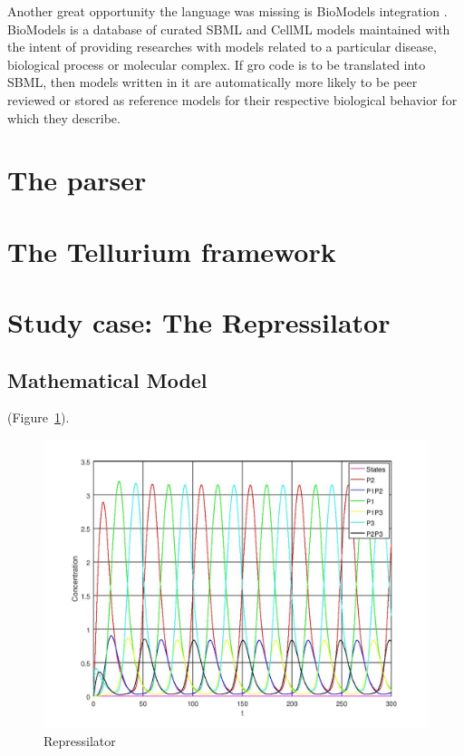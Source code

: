 \documentclass[12pt]{article}
\begin{document}
    Another great opportunity the language was missing is BioModels integration \cite{LeNovere2006}. BioModels is a database of curated SBML and CellML models maintained with the intent of providing researches with models related to a particular disease, biological process or molecular complex. If gro code is to be translated into SBML, then models written in it are automatically more likely to be peer reviewed or stored as reference models for their respective biological behavior for which they describe.

\section{The parser}
    \lipsum[1]

\section{The Tellurium framework}
    \lipsum[1]

\section{Study case: The Repressilator}
    \lipsum[1]

\subsection{Mathematical Model}
    \lipsum[1]
    \cite{Hucka2003}
    (Figure~\ref{fig:repressilator}).

\begin{figure}[ht]
\centering
\includegraphics[width=.5\textwidth]{repressilator.jpg}
\caption{Repressilator}
\label{fig:repressilator}
\end{figure}
\end{document}
